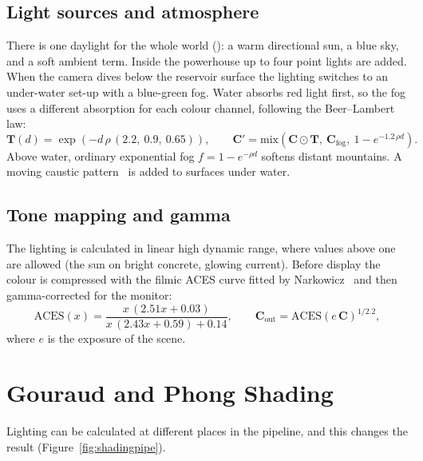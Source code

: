 \documentclass[11pt,a4paper]{report}
\newcommand{\code}[1]{\texttt{\detokenize{#1}}}
\newcommand{\vect}[1]{\mathbf{#1}}
\begin{document}
\subsection{Light sources and atmosphere}

There is one daylight for the whole world (\code{World::lighting}): a warm directional
sun, a blue sky, and a soft ambient term. Inside the powerhouse up to four point
lights are added. When the camera dives below the reservoir surface the lighting
switches to an under-water set-up with a blue-green fog. Water absorbs red light
first, so the fog uses a different absorption for each colour channel, following the
Beer--Lambert law:
\begin{equation}
\vect{T}(d) = \exp\!\left(-d\,\rho\,(2.2,\ 0.9,\ 0.65)\right),\qquad
\vect{C}' = \text{mix}\!\left(\vect{C}\odot\vect{T},\ \vect{C}_{\text{fog}},\ 1-e^{-1.2\,\rho d}\right).
\end{equation}
Above water, ordinary exponential fog $f = 1-e^{-\rho d}$ softens distant mountains.
A moving caustic pattern~\cite{caustic} is added to surfaces under water.

\subsection{Tone mapping and gamma}

The lighting is calculated in linear high dynamic range, where values above one are
allowed (the sun on bright concrete, glowing current). Before display the colour is
compressed with the filmic ACES curve fitted by Narkowicz~\cite{aces} and then
gamma-corrected for the monitor:
\begin{equation}
\text{ACES}(x) = \frac{x\,(2.51x+0.03)}{x\,(2.43x+0.59)+0.14},\qquad
\vect{C}_{\text{out}} = \text{ACES}(e\,\vect{C})^{1/2.2},
\end{equation}
where $e$ is the exposure of the scene.

\section{Gouraud and Phong Shading}

Lighting can be calculated at different places in the pipeline, and this changes the
result (Figure~\ref{fig:shadingpipe}).
\end{document}
